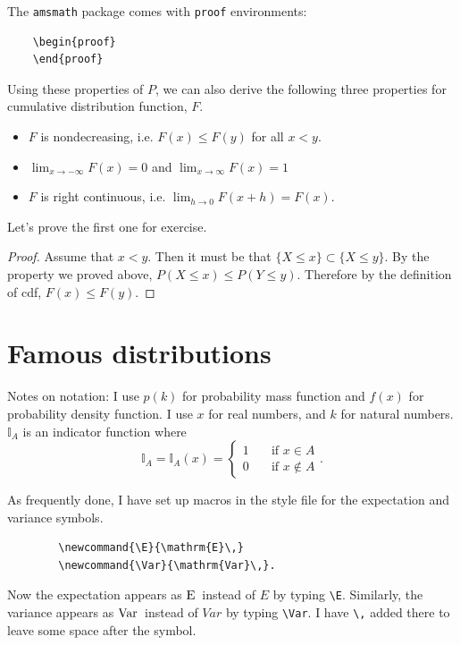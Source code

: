 \documentclass[12pt, notitlepage]{article}
\begin{document}
\begin{notes}
The \texttt{amsmath} package comes with \texttt{proof} environments:
	\begin{verbatim}
	\begin{proof}
	\end{proof}
	\end{verbatim}
\end{notes}

Using these properties of $P$, we can also derive the following three properties for cumulative distribution function, $F$.
	\begin{itemize}
	\item $F$ is nondecreasing, i.e. $F(x) \leq F(y)$ for all $x < y$.
	\item $\lim_{x \to - \infty}F(x) = 0$ and $\lim_{x \to \infty}F(x) = 1$
	\item $F$ is right continuous, i.e. $\lim_{h \to 0} F(x+h) = F(x)$.
	\end{itemize}
Let's prove the first one for exercise.
\begin{proof}
Assume that $x < y$. Then it must be that $\{X \leq x \} \subset \{X \leq y\}$. By the property we proved above, $P(X \leq x) \leq P(Y \leq y)$. Therefore by the definition of cdf, $F(x) \leq F(y)$.
\end{proof}




\section{Famous distributions}

Notes on notation: I use $p(k)$ for probability mass function and $f(x)$ for probability density function. I use $x$ for real numbers, and $k$ for natural numbers. $\mathbb{I}_{A}$ is an indicator function where 
	$$\mathbb{I}_{A} = \mathbb{I}_{A}(x) = \begin{cases}
											1 & \quad \text{if $x \in A$} \\
											0 & \quad \text{if $x \notin A$} \end{cases}.$$


\begin{notes}
As frequently done, I have set up macros in the style file for the expectation and variance symbols. 
        \begin{verbatim}
        \newcommand{\E}{\mathrm{E}\,}
        \newcommand{\Var}{\mathrm{Var}\,}.
        \end{verbatim}
Now the expectation appears as $\E$ instead of $E$ by typing \verb|\E|. Similarly, the variance appears as $\Var$ instead of $Var$ by typing \verb|\Var|. I have \verb|\,| added there to leave some space after the symbol.
\end{notes}
\end{document}
